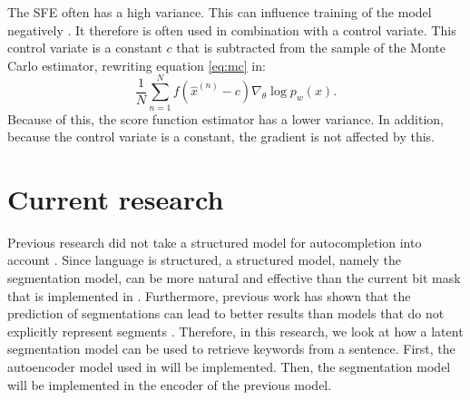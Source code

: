 The SFE often has a high variance. 
This can influence training of the model negatively .
It therefore is often used in combination with a control variate.
This control variate is a constant $c$ that is subtracted from the sample of the Monte Carlo estimator, rewriting equation \ref{eq:mc} in:
\begin{equation}
    \frac{1}{N} \sum_{n=1}^N f(\hat{x}^{(n)} - c) \nabla_{\theta} \log p_w(x).
\end{equation}
Because of this, the score function estimator has a lower variance. 
In addition, because the control variate is a constant, the gradient is not affected by this.

\section{Current research}

Previous research did not take a structured model for autocompletion into account .
Since language is structured, a structured model, namely the segmentation model, can be more natural and effective than the current bit mask that is implemented in .
Furthermore, previous work has shown that the prediction of segmentations can lead to better results than models that do not explicitly represent segments . 
Therefore, in this research, we look at how a latent segmentation model can be used to retrieve keywords from a sentence. 
First, the autoencoder model used in  will be implemented. 
Then, the segmentation model will be implemented in the encoder of the previous model. 
